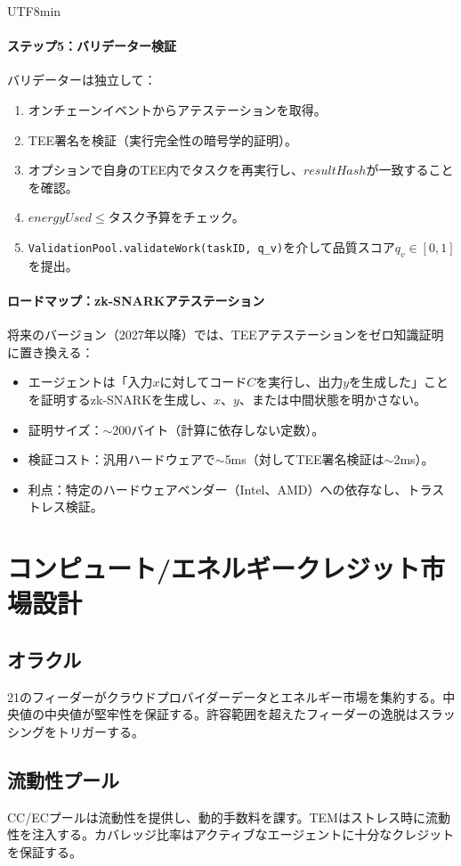 \documentclass[11pt]{article}
\begin{document}
\begin{CJK}{UTF8}{min}
\paragraph{ステップ5：バリデーター検証}
バリデーターは独立して：
\begin{enumerate}[noitemsep]
  \item オンチェーンイベントからアテステーションを取得。
  \item TEE署名を検証（実行完全性の暗号学的証明）。
  \item オプションで自身のTEE内でタスクを再実行し、$resultHash$が一致することを確認。
  \item $energyUsed \leq$タスク予算をチェック。
  \item \texttt{ValidationPool.validateWork(taskID, q\_v)}を介して品質スコア$q_v \in [0,1]$を提出。
\end{enumerate}

\paragraph{ロードマップ：zk-SNARKアテステーション}
将来のバージョン（2027年以降）では、TEEアテステーションをゼロ知識証明に置き換える：
\begin{itemize}[noitemsep]
  \item エージェントは「入力$x$に対してコード$C$を実行し、出力$y$を生成した」ことを証明するzk-SNARKを生成し、$x$、$y$、または中間状態を明かさない。
  \item 証明サイズ：$\sim$200バイト（計算に依存しない定数）。
  \item 検証コスト：汎用ハードウェアで$\sim$5ms（対してTEE署名検証は$\sim$2ms）。
  \item 利点：特定のハードウェアベンダー（Intel、AMD）への依存なし、トラストレス検証。
\end{itemize}

\section{コンピュート/エネルギークレジット市場設計}
\subsection{オラクル}
21のフィーダーがクラウドプロバイダーデータとエネルギー市場を集約する。中央値の中央値が堅牢性を保証する。許容範囲を超えたフィーダーの逸脱はスラッシングをトリガーする。

\subsection{流動性プール}
CC/ECプールは流動性を提供し、動的手数料を課す。TEMはストレス時に流動性を注入する。カバレッジ比率はアクティブなエージェントに十分なクレジットを保証する。


\end{CJK}
\end{document}
